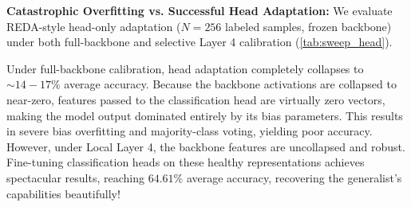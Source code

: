 \documentclass{article}
\begin{document}
\textbf{Catastrophic Overfitting vs. Successful Head Adaptation:}
We evaluate REDA-style head-only adaptation ($N=256$ labeled samples, frozen backbone) under both full-backbone and selective Layer 4 calibration (\cref{tab:sweep_head}).

\begin{table}[h]
\caption{REDA head-only adaptation accuracies (\%) after 10 epochs under $N=256$ labeled samples per task.}
\label{tab:sweep_head}
\begin{center}
\begin{small}
\end{small}
\end{center}
\end{table}

Under full-backbone calibration, head adaptation completely collapses to $\sim 14-17\%$ average accuracy. Because the backbone activations are collapsed to near-zero, features passed to the classification head are virtually zero vectors, making the model output dominated entirely by its bias parameters. This results in severe bias overfitting and majority-class voting, yielding poor accuracy.
However, under Local Layer 4, the backbone features are uncollapsed and robust. Fine-tuning classification heads on these healthy representations achieves spectacular results, reaching \textbf{$64.61\%$} average accuracy, recovering the generalist's capabilities beautifully!
\end{document}
